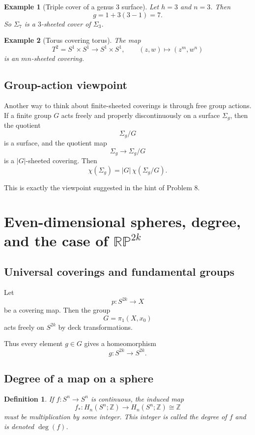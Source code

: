 \documentclass[12pt,a4paper]{article}
\newcommand{\Z}{\mathbb{Z}}
\newcommand{\RP}{\mathbb{RP}}
\newcommand{\Chi}{\chi}
\newtheorem{example}{Example}
\theoremstyle{notespace}
\newtheorem{definition}{Definition}[section]
\begin{document}
	\begin{example}[Triple cover of a genus $3$ surface]
		Let $h=3$ and $n=3$. Then
		\[
		g=1+3(3-1)=7.
		\]
		So $\Sigma_7$ is a $3$-sheeted cover of $\Sigma_3$.
	\end{example}
	
	\begin{example}[Torus covering torus]
		The map
		\[
		T^2=S^1\times S^1\to S^1\times S^1,\qquad (z,w)\mapsto (z^m,w^n)
		\]
		is an $mn$-sheeted covering.
	\end{example}
	
	\subsection{Group-action viewpoint}
	
	Another way to think about finite-sheeted coverings is through free group actions. If a finite group $G$ acts freely and properly discontinuously on a surface $\Sigma_g$, then the quotient
	\[
	\Sigma_g/G
	\]
	is a surface, and the quotient map
	\[
	\Sigma_g\to \Sigma_g/G
	\]
	is a $|G|$-sheeted covering. Then
	\[
	\Chi(\Sigma_g)=|G|\,\Chi(\Sigma_g/G).
	\]
	
	This is exactly the viewpoint suggested in the hint of Problem 8.
	
	\section{Even-dimensional spheres, degree, and the case of \texorpdfstring{$\RP^{2k}$}{RP2k}}
	
	\subsection{Universal coverings and fundamental groups}
	
	Let
	\[
	p:S^{2k}\to X
	\]
	be a covering map. Then the group
	\[
	G=\pi_1(X,x_0)
	\]
	acts freely on $S^{2k}$ by deck transformations.
	
	Thus every element $g\in G$ gives a homeomorphism
	\[
	g:S^{2k}\to S^{2k}.
	\]
	
	\subsection{Degree of a map on a sphere}
	
	\begin{definition}
		If $f:S^n\to S^n$ is continuous, the induced map
		\[
		f_*:H_n(S^n;\Z)\to H_n(S^n;\Z)\cong \Z
		\]
		must be multiplication by some integer. This integer is called the \emph{degree} of $f$ and is denoted $\deg(f)$.
	\end{definition}
	
\end{document}
